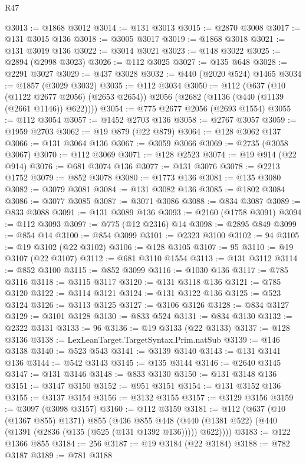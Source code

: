 \begin{lexlean}{R47}
\begin{coremodule}
@3013 := @1868 @3012
@3014 := @131 @3013
@3015 := @2870 @3008
@3017 := @131 @3015 @136
@3018 := @3005 @3017
@3019 := @1868 @3018
@3021 := @131 @3019 @136
@3022 := @3014 @3021
@3023 := @148 @3022
@3025 := @2894 (@2998 @3023)
@3026 := @112 @3025
@3027 := @135 @648
@3028 := @2291 @3027
@3029 := @437 @3028
@3032 := @440 (@2020 @524) @1465
@3034 := @1857 (@3029 @3032)
@3035 := @112 @3034
@3050 := @112
    (@637
      (@10 (@1122 @2677 @2056) (@2653 @2654))
      @2056
      (@2682 (@1136 (@440 (@1139 (@2661 @1146)) @622))))
@3054 := @775 @2677 @2056 (@2693 @1554)
@3055 := @112 @3054
@3057 := @1452 @2703 @136
@3058 := @2767 @3057
@3059 := @1959 @2703
@3062 := @19 @879 (@22 @879)
@3064 := @128 @3062 @137
@3066 := @131 @3064 @136
@3067 := @3059 @3066
@3069 := @2735 (@3058 @3067)
@3070 := @112 @3069
@3071 := @128 @2523
@3074 := @19 @914 (@22 @914)
@3076 := @681 @3074 @136
@3077 := @131 @3076
@3078 := @2213 @1752
@3079 := @852 @3078
@3080 := @1773 @136
@3081 := @135 @3080
@3082 := @3079 @3081
@3084 := @131 @3082 @136
@3085 := @1802 @3084
@3086 := @3077 @3085
@3087 := @3071 @3086
@3088 := @834 @3087
@3089 := @833 @3088
@3091 := @131 @3089 @136
@3093 := @2160 (@1758 @3091)
@3094 := @112 @3093
@3097 := @775 (@12 @2316) @14
@3098 := @2895 @849
@3099 := @854 @14
@3100 := @854 @3099
@3101 := @2323 @3100
@3102 := 94
@3105 := @19 @3102 (@22 @3102)
@3106 := @128 @3105
@3107 := 95
@3110 := @19 @3107 (@22 @3107)
@3112 := @681 @3110 @1554
@3113 := @131 @3112
@3114 := @852 @3100
@3115 := @852 @3099
@3116 := @1030 @136
@3117 := @785 @3116
@3118 := @3115 @3117
@3120 := @131 @3118 @136
@3121 := @785 @3120
@3122 := @3114 @3121
@3124 := @131 @3122 @136
@3125 := @523 @3124
@3126 := @3113 @3125
@3127 := @3106 @3126
@3128 := @834 @3127
@3129 := @3101 @3128
@3130 := @833 @524
@3131 := @834 @3130
@3132 := @2322 @3131
@3133 := 96
@3136 := @19 @3133 (@22 @3133)
@3137 := @128 @3136
@3138 := LexLeanTarget.TargetSyntax.Prim.natSub
@3139 := @146 @3138
@3140 := @523 @543
@3141 := @3139 @3140
@3143 := @131 @3141 @136
@3144 := @542 @3143
@3145 := @135 @3144
@3146 := @2640 @3145
@3147 := @131 @3146
@3148 := @833 @3130
@3150 := @131 @3148 @136
@3151 := @3147 @3150
@3152 := @951 @3151
@3154 := @131 @3152 @136
@3155 := @3137 @3154
@3156 := @3132 @3155
@3157 := @3129 @3156
@3159 := @3097 (@3098 @3157)
@3160 := @112 @3159
@3181 := @112
    (@637
      (@10 (@1367 @855) @1371)
      @855
      (@436
        @855
        @448
        (@440 (@1381 @522) (@440 (@1391 (@2836 (@135 (@525 (@131 @1392 @136))))) @622))))
@3183 := @122 @1366 @855
@3184 := 256
@3187 := @19 @3184 (@22 @3184)
@3188 := @782 @3187
@3189 := @781 @3188

\end{coremodule}
\end{lexlean}
